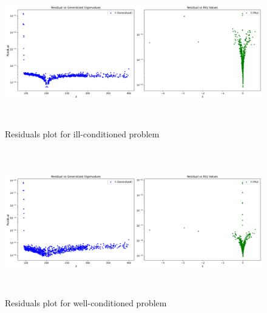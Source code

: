 \begin{figure}
\centering
        \caption{Residuals plot for ill-conditioned problem}
	\includegraphics[height=2.5in]{./Plots/LU/residuals_plot_ill.png}
	
        \label{fig:LUResidualsIll}
\end{figure}

\begin{figure}
\centering
        \caption{Residuals plot for well-conditioned problem}
	\includegraphics[height=2.5in]{./Plots/LU/residuals_plot_well.png}
	
        \label{fig:LUResidualsWell}
\end{figure}

